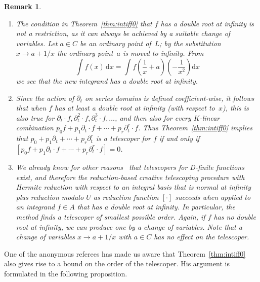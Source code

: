 \documentclass[final,1p,times,authoryear]{elsarticle}
\newtheorem{remark}[theorem]{Remark}
\begin{document}
\begin{remark}
  \begin{enumerate}
  \item The condition in Theorem~\ref{thm:intiff0} that $f$ has a double
root at infinity is not a restriction, as it can always be achieved by
a suitable change of variables. Let $a\in C$ be an ordinary point of~$L$; by
the substitution $x\to a+1/x$ the ordinary point~$a$ is moved to
infinity. From
\[
  \int f(x) \,\mathrm{d}x = \int f\left(\frac{1}{x}+a\right)\left(-\frac{1}{x^2}\right) \mathrm{d}x
\]
we see that the new integrand has a double root at infinity.
  \item Since the action of $\partial_t$ on series domains is defined coefficient-wise,
it follows that when $f$ has at least a double root at infinity (with respect to~$x$),
this is also true for $\partial_t\cdot f, \partial_t^2\cdot f, \partial_t^3\cdot f,\dots$,
and then also for every $K$-linear combination $p_0f+p_1\partial_t\cdot f+\cdots+p_r\partial_t^r\cdot f$.
Thus Theorem~\ref{thm:intiff0} implies that $p_0+p_1\partial_t+\cdots+p_r\partial_t^r$
is a telescoper for $f$ if \emph{and only if}
$[p_0f+p_1\partial_t\cdot f+\cdots+p_r\partial_t^r\cdot f]=0$.
  \item We already know for other reasons~\citep{Zeilberger1990,chyzak00} that
telescopers for D-finite functions exist, and therefore the reduction-based
creative telescoping procedure with Hermite reduction with respect to an
integral basis that is normal at infinity plus reduction modulo $U$
as reduction function $[\cdot]$ succeeds when applied to an integrand $f\in A$ that has a double root at infinity.
In particular, the method finds a telescoper of smallest possible order.
Again, if $f$ has no double root at infinity, we can produce one by a change of variables.
Note that a change of variables $x\to a+1/x$ with $a\in C$ has no effect on
the telescoper.
  \end{enumerate}
\end{remark}

One of the anonymous referees has made us aware that Theorem~\ref{thm:intiff0} also gives rise to
a bound on the order of the telescoper. His argument is formulated in the following proposition.
\end{document}
